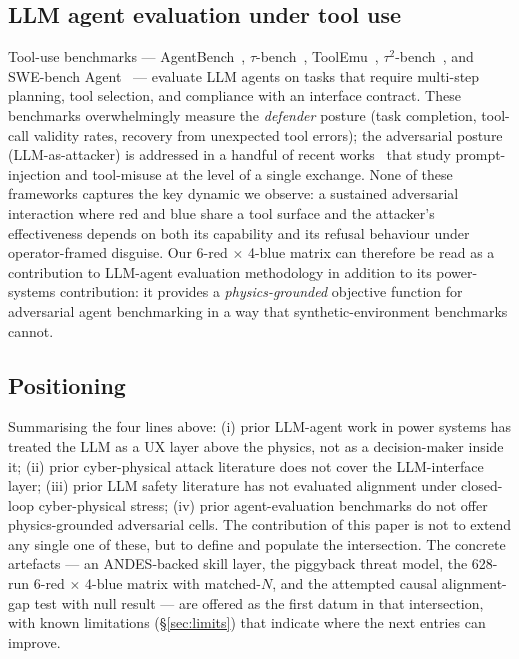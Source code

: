 \documentclass[journal,twocolumn,10pt]{IEEEtran}
\begin{document}
\subsection{LLM agent evaluation under tool use}

Tool-use benchmarks --- AgentBench~\cite{liu23agentbench}, $\tau$-bench~\cite{lange24taubench}, ToolEmu~\cite{ruan24toolemu}, $\tau^2$-bench~\cite{tau2bench}, and SWE-bench Agent~\cite{swebench-agent} --- evaluate LLM agents on tasks that require multi-step planning, tool selection, and compliance with an interface contract. These benchmarks overwhelmingly measure the \emph{defender} posture (task completion, tool-call validity rates, recovery from unexpected tool errors); the adversarial posture (LLM-as-attacker) is addressed in a handful of recent works~\cite{tool-attacks,adv-agent} that study prompt-injection and tool-misuse at the level of a single exchange. None of these frameworks captures the key dynamic we observe: a sustained adversarial interaction where red and blue share a tool surface and the attacker's effectiveness depends on both its capability and its refusal behaviour under operator-framed disguise. Our 6-red $\times$ 4-blue matrix can therefore be read as a contribution to LLM-agent evaluation methodology in addition to its power-systems contribution: it provides a \emph{physics-grounded} objective function for adversarial agent benchmarking in a way that synthetic-environment benchmarks cannot.

\subsection{Positioning}

Summarising the four lines above: (i) prior LLM-agent work in power systems has treated the LLM as a UX layer above the physics, not as a decision-maker inside it; (ii) prior cyber-physical attack literature does not cover the LLM-interface layer; (iii) prior LLM safety literature has not evaluated alignment under closed-loop cyber-physical stress; (iv) prior agent-evaluation benchmarks do not offer physics-grounded adversarial cells. The contribution of this paper is not to extend any single one of these, but to define and populate the intersection. The concrete artefacts --- an ANDES-backed skill layer, the piggyback threat model, the 628-run 6-red $\times$ 4-blue matrix with matched-$N$, and the attempted causal alignment-gap test with null result --- are offered as the first datum in that intersection, with known limitations (\S\ref{sec:limits}) that indicate where the next entries can improve.
\end{document}
